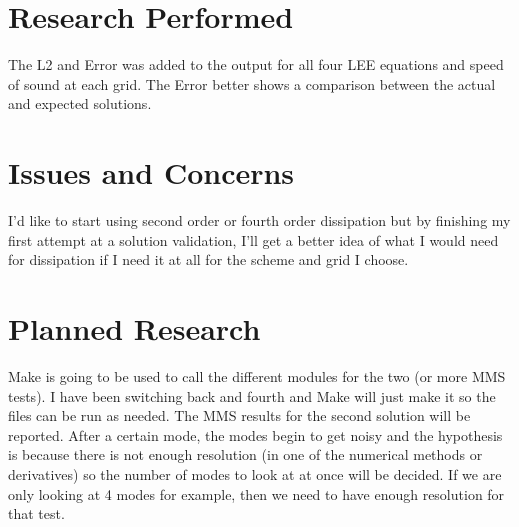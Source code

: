 \documentclass[a4paper]{article}
\begin{document}
\section{Research Performed}
The L2 and Error was added to the output for all four LEE equations and speed of
sound at each grid. The Error better shows a comparison between the actual and expected 
solutions. 

\section{Issues and Concerns}
I'd like to start using second order or fourth order dissipation but by finishing 
my first attempt at a solution validation, I'll get a better idea of what I would
need for dissipation if I need it at all for the scheme and grid I choose. 

\section{Planned Research}
Make is going to be used to call the different modules for the two (or more MMS 
tests). I have been switching back and fourth and Make will just make it so the 
files can be run as needed. The MMS results for the second solution will be 
reported.
After a certain mode, the modes begin to get noisy and the hypothesis is because
there is not enough resolution (in one of the numerical methods or derivatives) 
so the number of modes to look at at once will be decided. If we are only looking
at 4 modes for example, then we need to have enough resolution for that test.
\end{document}

